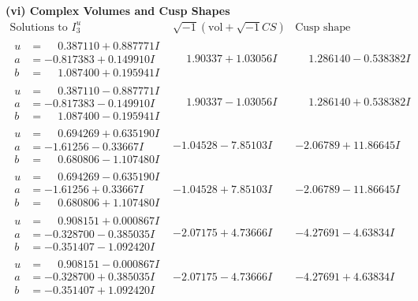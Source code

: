 \documentclass[1p]{elsarticle_modified}
\theoremstyle{definition}
\newcommand{\I}{\sqrt{-1}}
\begin{document}
\newpage\flushleft \textbf{(vi) Complex Volumes and Cusp Shapes}
$$\begin{array}{c|c|c}  
\text{Solutions to }I^u_{3}& \I (\text{vol} + \sqrt{-1}CS) & \text{Cusp shape}\\
 \hline 
\begin{aligned}
u &= \phantom{-}0.387110 + 0.887771 I \\
a &= -0.817383 + 0.149910 I \\
b &= \phantom{-}1.087400 + 0.195941 I\end{aligned}
 & \phantom{-}1.90337 + 1.03056 I & \phantom{-}1.286140 - 0.538382 I \\ \hline\begin{aligned}
u &= \phantom{-}0.387110 - 0.887771 I \\
a &= -0.817383 - 0.149910 I \\
b &= \phantom{-}1.087400 - 0.195941 I\end{aligned}
 & \phantom{-}1.90337 - 1.03056 I & \phantom{-}1.286140 + 0.538382 I \\ \hline\begin{aligned}
u &= \phantom{-}0.694269 + 0.635190 I \\
a &= -1.61256 - 0.33667 I \\
b &= \phantom{-}0.680806 - 1.107480 I\end{aligned}
 & -1.04528 - 7.85103 I & -2.06789 + 11.86645 I \\ \hline\begin{aligned}
u &= \phantom{-}0.694269 - 0.635190 I \\
a &= -1.61256 + 0.33667 I \\
b &= \phantom{-}0.680806 + 1.107480 I\end{aligned}
 & -1.04528 + 7.85103 I & -2.06789 - 11.86645 I \\ \hline\begin{aligned}
u &= \phantom{-}0.908151 + 0.000867 I \\
a &= -0.328700 - 0.385035 I \\
b &= -0.351407 - 1.092420 I\end{aligned}
 & -2.07175 + 4.73666 I & -4.27691 - 4.63834 I \\ \hline\begin{aligned}
u &= \phantom{-}0.908151 - 0.000867 I \\
a &= -0.328700 + 0.385035 I \\
b &= -0.351407 + 1.092420 I\end{aligned}
 & -2.07175 - 4.73666 I & -4.27691 + 4.63834 I \\ \hline\begin{aligned}

\end{aligned}
\end{array}$$
\end{document}
